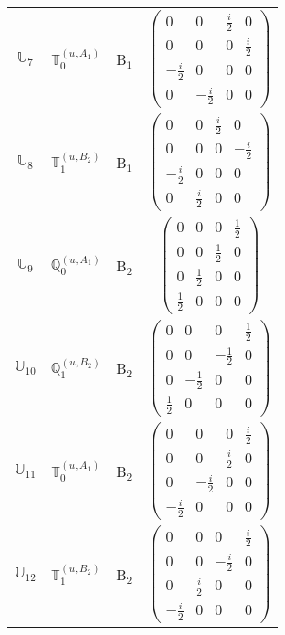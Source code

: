 \documentclass[fleqn,10pt,landscape]{article}
\begin{document}
\begin{itemize}
\begin{center}
\begin{longtable}{c|c|c|c}
$ \mathbb{U}_{7} $ & $\mathbb{T}_{0}^{(u,A_{1})}$ & B$_{1}$ & $\begin{pmatrix} 0 & 0 & \frac{i}{2} & 0 \\ 0 & 0 & 0 & \frac{i}{2} \\ - \frac{i}{2} & 0 & 0 & 0 \\ 0 & - \frac{i}{2} & 0 & 0 \end{pmatrix}$ \\
$ \mathbb{U}_{8} $ & $\mathbb{T}_{1}^{(u,B_{2})}$ & B$_{1}$ & $\begin{pmatrix} 0 & 0 & \frac{i}{2} & 0 \\ 0 & 0 & 0 & - \frac{i}{2} \\ - \frac{i}{2} & 0 & 0 & 0 \\ 0 & \frac{i}{2} & 0 & 0 \end{pmatrix}$ \\ \hline
$ \mathbb{U}_{9} $ & $\mathbb{Q}_{0}^{(u,A_{1})}$ & B$_{2}$ & $\begin{pmatrix} 0 & 0 & 0 & \frac{1}{2} \\ 0 & 0 & \frac{1}{2} & 0 \\ 0 & \frac{1}{2} & 0 & 0 \\ \frac{1}{2} & 0 & 0 & 0 \end{pmatrix}$ \\
$ \mathbb{U}_{10} $ & $\mathbb{Q}_{1}^{(u,B_{2})}$ & B$_{2}$ & $\begin{pmatrix} 0 & 0 & 0 & \frac{1}{2} \\ 0 & 0 & - \frac{1}{2} & 0 \\ 0 & - \frac{1}{2} & 0 & 0 \\ \frac{1}{2} & 0 & 0 & 0 \end{pmatrix}$ \\
$ \mathbb{U}_{11} $ & $\mathbb{T}_{0}^{(u,A_{1})}$ & B$_{2}$ & $\begin{pmatrix} 0 & 0 & 0 & \frac{i}{2} \\ 0 & 0 & \frac{i}{2} & 0 \\ 0 & - \frac{i}{2} & 0 & 0 \\ - \frac{i}{2} & 0 & 0 & 0 \end{pmatrix}$ \\
$ \mathbb{U}_{12} $ & $\mathbb{T}_{1}^{(u,B_{2})}$ & B$_{2}$ & $\begin{pmatrix} 0 & 0 & 0 & \frac{i}{2} \\ 0 & 0 & - \frac{i}{2} & 0 \\ 0 & \frac{i}{2} & 0 & 0 \\ - \frac{i}{2} & 0 & 0 & 0 \end{pmatrix}$ \\ \hline

\end{longtable}
\end{center}
\end{itemize}
\end{document}
